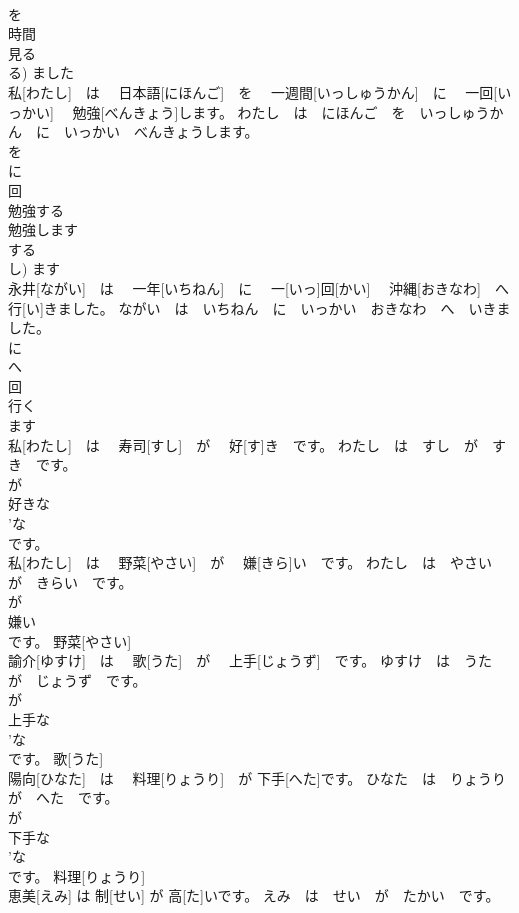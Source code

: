 \documentclass[8pt]{extreport}
\begin{document}
\begin{CJK}{UTF8}{min}
\\	を 
\\	時間 
\\	見る 
\\	る)	ました 
\\	私[わたし]　は　 日本語[にほんご]　を　 一週間[いっしゅうかん]　に　 一回[いっかい]　 勉強[べんきょう]します。	わたし　は　にほんご　を　いっしゅうかん　に　いっかい　べんきょうします。	
\\	を 
\\	に 
\\	回 
\\	勉強する 
\\	勉強します 
\\	する 
\\	し)	ます 
\\	永井[ながい]　は　 一年[いちねん]　に　 一[いっ]回[かい]　 沖縄[おきなわ]　へ　 行[い]きました。	ながい　は　いちねん　に　いっかい　おきなわ　へ　いきました。	
\\	に 
\\	へ 
\\	回 
\\	行く 
\\	ます 
\\	私[わたし]　は　 寿司[すし]　が　 好[す]き　です。	わたし　は　すし　が　すき　です。	
\\	が 
\\	好きな 
\\	'な
\\	です。	
\\	私[わたし]　は　 野菜[やさい]　が　 嫌[きら]い　です。	わたし　は　やさい　が　きらい　です。	
\\	が 
\\	嫌い 
\\	です。	野菜[やさい] 
\\	諭介[ゆすけ]　は　 歌[うた]　が　 上手[じょうず]　です。	ゆすけ　は　うた　が　じょうず　です。	
\\	が 
\\	上手な 
\\	'な
\\	です。	歌[うた] 
\\	陽向[ひなた]　は　 料理[りょうり]　が 下手[へた]です。	ひなた　は　りょうり　が　へた　です。	
\\	が 
\\	下手な 
\\	'な
\\	です。	料理[りょうり] 
\\	恵美[えみ] は 制[せい] が 高[た]いです。	えみ　は　せい　が　たかい　です。	

\end{CJK}
\end{document}
